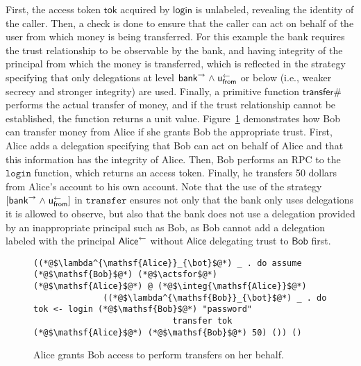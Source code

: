 First, the access token $\mathsf{tok}$ acquired by $\mathsf{login}$ is unlabeled, revealing the identity of the caller. Then, a check is done to ensure that the caller can act on behalf of the user from which money is being transferred. For this example the bank requires the trust relationship to be observable by the bank, and having integrity of the principal from which the money is transferred, which is reflected in the strategy specifying that only delegations at level $\mathsf{bank}^{\rightarrow} \mathrel{\land} \mathsf{u}_{\mathsf{from}}^{\leftarrow}$ or below (i.e., weaker secrecy and stronger integrity) are used. Finally, a primitive function $\mathsf{transfer\#}$ performs the actual transfer of money, and if the trust relationship cannot be established, the function returns a unit value. Figure~\ref{fig:bob-transfer-from-alice} demonstrates how Bob can transfer money from Alice if she grants Bob the appropriate trust. First, Alice adds a delegation specifying that Bob can act on behalf of Alice and that this information has the integrity of Alice. Then, Bob performs an RPC to the $\mathtt{login}$ function, which returns an access token. Finally, he transfers 50 dollars from Alice's account to his own account. Note that the use of the strategy $[\mathsf{bank}^{\rightarrow} \mathrel{\land} \mathsf{u}_{\mathsf{from}}^{\leftarrow}]$ in $\mathtt{transfer}$ ensures not only that the bank only uses delegations it is allowed to observe, but also that the bank does not use a delegation provided by an inappropriate principal such as Bob, as Bob cannot add a delegation labeled with the principal $\mathsf{Alice}^{\leftarrow}$ without $\mathsf{Alice}$ delegating trust to $\mathsf{Bob}$ first.

\begin{figure}
\centering
\begin{lstlisting}
((*@$\lambda^{\mathsf{Alice}}_{\bot}$@*) _ . do assume (*@$\mathsf{Bob}$@*) (*@$\actsfor$@*) (*@$\mathsf{Alice}$@*) @ (*@$\integ{\mathsf{Alice}}$@*)
              ((*@$\lambda^{\mathsf{Bob}}_{\bot}$@*) _ . do tok <- login (*@$\mathsf{Bob}$@*) "password"
                            transfer tok (*@$\mathsf{Alice}$@*) (*@$\mathsf{Bob}$@*) 50) ()) ()
\end{lstlisting}
\caption{Alice grants Bob access to perform transfers on her behalf.}
\label{fig:bob-transfer-from-alice}
\end{figure}